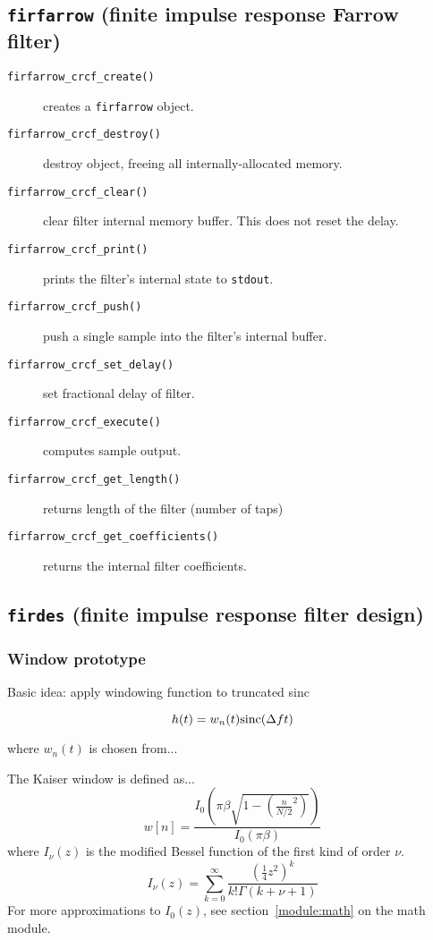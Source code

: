 \subsection{{\tt firfarrow} (finite impulse response Farrow filter)}
\begin{description}
\item[{\tt firfarrow\_crcf\_create()}]
    creates a {\tt firfarrow} object.
\item[{\tt firfarrow\_crcf\_destroy()}]
    destroy object, freeing all internally-allocated memory.
\item[{\tt firfarrow\_crcf\_clear()}]
    clear filter internal memory buffer.
    This does not reset the delay.
\item[{\tt firfarrow\_crcf\_print()}]
    prints the filter's internal state to {\tt stdout}.
\item[{\tt firfarrow\_crcf\_push()}]
    push a single sample into the filter's internal buffer.
\item[{\tt firfarrow\_crcf\_set\_delay()}]
    set fractional delay of filter.
\item[{\tt firfarrow\_crcf\_execute()}]
    computes sample output.
\item[{\tt firfarrow\_crcf\_get\_length()}]
    returns length of the filter (number of taps)
\item[{\tt firfarrow\_crcf\_get\_coefficients()}]
    returns the internal filter coefficients.
\end{description}

\subsection{{\tt firdes} (finite impulse response filter design)}
\label{module:filter:firdes}

\subsubsection{Window prototype}
Basic idea: apply windowing function to truncated sinc

\begin{equation}
h(t) = w_n(t) \textup{sinc}(\Delta f t)
\end{equation}

where $w_n(t)$ is chosen from...

The Kaiser window is defined as...
\begin{equation}
\label{eqn:kaiser_window}
    w[n] = \frac{
        I_0\left(\pi\beta\sqrt{1-\left(\frac{n}{N/2}^2\right)}\right)
    }{
        I_0\left(\pi\beta\right)
    }
\end{equation}
where $I_\nu(z)$ is the modified Bessel function of the first kind of order
$\nu$.
\begin{equation}
\label{eqn:besseli_infinite_sum}
    I_\nu(z) = \sum_{k=0}^{\infty}{
        \frac{
            \left(\frac{1}{4}z^2\right)^k
        }{
            k!\Gamma(k+\nu+1)
        }
    }
\end{equation}
For more approximations to $I_0(z)$, see section~\ref{module:math} on the math
module.

